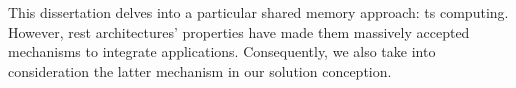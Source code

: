 This dissertation delves into a particular shared memory approach: \acl{ts} computing. %
However, \ac{rest} architectures' properties have made them massively accepted mechanisms to integrate applications.
Consequently, we also take into consideration the latter mechanism in our solution conception.